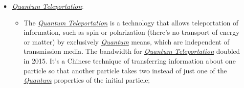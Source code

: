 \documentclass[conference]{IEEEtran}
\begin{document}
\begin{itemize}
  \item \href{https://en.wikipedia.org/wiki/Quantum_teleportation}{\textit{Quantum Teleportation}}:
    \begin{itemize}
        \item The \href{https://en.wikipedia.org/wiki/Quantum_teleportation}{\textit{Quantum Teleportation}} is a technology that allows teleportation of information, such as spin or polarization (there's no transport of energy or matter) by exclusively \href{https://en.wikipedia.org/wiki/Quantum}{\textit{Quantum}} means, which are independent of transmission media. The bandwidth for \href{https://en.wikipedia.org/wiki/Quantum_teleportation}{\textit{Quantum Teleportation}} doubled in 2015. It's a Chinese technique of transferring information about one particle so that another particle takes two instead of just one of the \href{https://en.wikipedia.org/wiki/Quantum}{\textit{Quantum}} properties of the initial particle;
    \end{itemize}

  \vspace{4pt}


\end{itemize}
\end{document}

